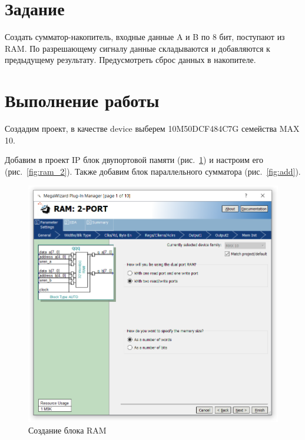 \documentclass[a4paper,14pt]{article}
\begin{document}

\tableofcontents
\pagebreak

\section{Задание}

Создать сумматор-накопитель, входные данные A и B по 8 бит, поступают из RAM. 
По разрешающему сигналу данные складываются и добавляются к предыдущему результату.
Предусмотреть сброс данных в накопителе.

\section{Выполнение работы}

Создадим проект, в качестве device выберем 10M50DCF484C7G семейства MAX 10.

Добавим в проект IP блок двупортовой памяти (рис.~\ref{fig:ram_1}) и настроим его (рис.~\ref{fig:ram_2}).
Также добавим блок параллельного сумматора (рис.~\ref*{fig:add}).

\begin{figure}[H]
	\centering
	\includegraphics[width=\linewidth]{image/ram_1}
	\caption{Создание блока RAM}
	\label{fig:ram_1}
\end{figure}
\end{document}
